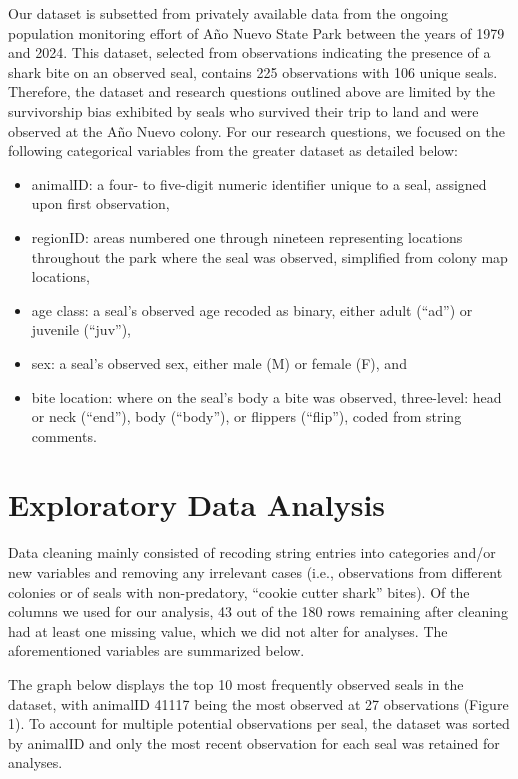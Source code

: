 \documentclass[
  12pt]{article}
\providecommand{\tightlist}{%
  \setlength{\itemsep}{0pt}\setlength{\parskip}{0pt}}
\begin{document}
Our dataset is subsetted from privately available data from the ongoing
population monitoring effort of Año Nuevo State Park between the years
of 1979 and 2024. This dataset, selected from observations indicating
the presence of a shark bite on an observed seal, contains 225
observations with 106 unique seals. Therefore, the dataset and research
questions outlined above are limited by the survivorship bias exhibited
by seals who survived their trip to land and were observed at the Año
Nuevo colony. For our research questions, we focused on the following
categorical variables from the greater dataset as detailed below:

\begin{itemize}
\tightlist
\item
  animalID: a four- to five-digit numeric identifier unique to a seal,
  assigned upon first observation,
\item
  regionID: areas numbered one through nineteen representing locations
  throughout the park where the seal was observed, simplified from
  colony map locations,~
\item
  age class: a seal's observed age recoded as binary, either adult
  (``ad'') or juvenile (``juv''),
\item
  sex: a seal's observed sex, either male (M) or female (F), and~
\item
  bite location: where on the seal's body a bite was observed,
  three-level: head or neck (``end''), body (``body''), or flippers
  (``flip''), coded from string comments.
\end{itemize}

\section{Exploratory Data Analysis}\label{exploratory-data-analysis}

Data cleaning mainly consisted of recoding string entries into
categories and/or new variables and removing any irrelevant cases (i.e.,
observations from different colonies or of seals with non-predatory,
``cookie cutter shark'' bites). Of the columns we used for our analysis,
43 out of the 180 rows remaining after cleaning had at least one missing
value, which we did not alter for analyses. The aforementioned variables
are summarized below.~

The graph below displays the top 10 most frequently observed seals in
the dataset, with animalID 41117 being the most observed at 27
observations (Figure 1). To account for multiple potential observations
per seal, the dataset was sorted by animalID and only the most recent
observation for each seal was retained for analyses.~
\end{document}
